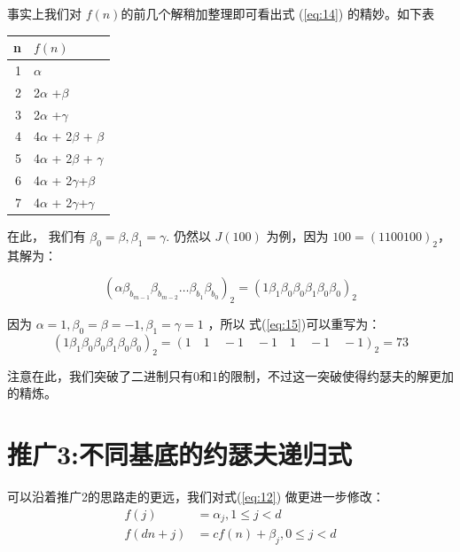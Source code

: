 \documentclass[10pt,a4paper,UTF8]{article}
\begin{document}
事实上我们对 \(f(n)\)的前几个解稍加整理即可看出式 (\ref{eq:14}) 的精妙。如下表
\begin{center}
\begin{tabular}{rl}
\hline
n & \(f(n)\)\\
\hline
1 & \(\alpha\)\\
\hline
2 & 2\(\alpha\) +\(\beta\)\\
3 & 2\(\alpha\) +\(\gamma\)\\
\hline
4 & 4\(\alpha\) + 2\(\beta\) + \(\beta\)\\
5 & 4\(\alpha\) + 2\(\beta\) + \(\gamma\)\\
6 & 4\(\alpha\) + 2\(\gamma\)+\(\beta\)\\
7 & 4\(\alpha\) + 2\(\gamma\)+\(\gamma\)\\
\hline
\end{tabular}
\end{center}

在此， 我们有 \(\beta_{0} = \beta , \beta_{1} = \gamma\). 仍然以 \(J(100)\) 为例，因为 \(100 = (1100100)_{2}\)， 其解为：

\begin{equation}
\label{eq:15}
(\alpha\beta_{b_{m-1}}\beta_{b_{m-2}}\ldots \beta_{b_{1}}\beta_{b_{0}})_{2} = ( 1 \beta_{1} \beta_{0}\beta_{0} \beta_{1}\beta_{0}\beta_{0})_{2} 
\end{equation} 

因为 \(\alpha = 1, \beta_{0}=\beta = -1, \beta_{1}=\gamma=1\) ，所以 式(\ref{eq:15})可以重写为：
\begin{equation}
\label{eq:16}
( 1 \beta_{1} \beta_{0}\beta_{0} \beta_{1}\beta_{0}\beta_{0})_{2} = (1\quad 1\quad -1\quad -1\quad 1\quad -1\quad -1)_{2} = 73
\end{equation}

注意在此，我们突破了二进制只有0和1的限制，不过这一突破使得约瑟夫的解更加的精炼。
\section{推广3:不同基底的约瑟夫递归式}
\label{sec:orgheadline6}


可以沿着推广2的思路走的更远，我们对式(\ref{eq:12}) 做更进一步修改：
\begin{equation}
\label{eq:17}
\begin{split}
f(j) &=  \alpha_{j}, 1\le j < d \\
f(dn+j)&= c f(n) +\beta_{j}, 0\le j < d 
\end{split}
\end{equation}
\end{document}

